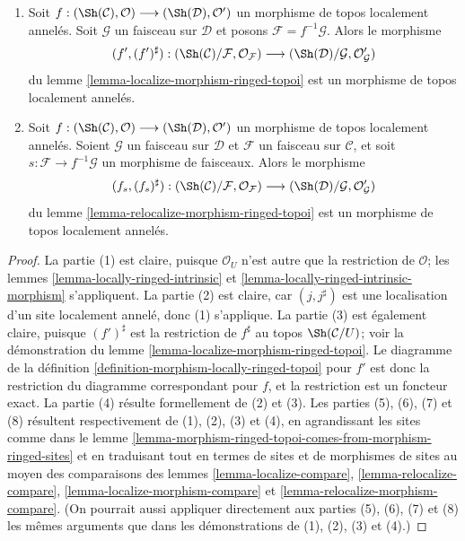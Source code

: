 \begin{lemma}
\begin{enumerate}
Soit $s : \mathcal{G} \to \mathcal{F}$ une application de faisceaux sur
$\mathcal{C}$. Alors le morphisme
$$
(j, j^\sharp) :
(\Sh(\mathcal{C})/\mathcal{G}, \mathcal{O}_\mathcal{G})
\longrightarrow
(\Sh(\mathcal{C})/\mathcal{F}, \mathcal{O}_\mathcal{F})
$$
du lemme \ref{lemma-relocalize-ringed-topos} est un morphisme de topos
localement annelés.
\item Soit
$f :
(\Sh(\mathcal{C}), \mathcal{O})
\longrightarrow
(\Sh(\mathcal{D}), \mathcal{O}')$
un morphisme de topos localement annelés. Soit $\mathcal{G}$ un faisceau sur
$\mathcal{D}$ et posons $\mathcal{F} = f^{-1}\mathcal{G}$. Alors le morphisme
$$
(f', (f')^\sharp) :
(\Sh(\mathcal{C})/\mathcal{F}, \mathcal{O}_\mathcal{F})
\longrightarrow
(\Sh(\mathcal{D})/\mathcal{G}, \mathcal{O}'_\mathcal{G})
$$
du lemme \ref{lemma-localize-morphism-ringed-topoi} est un morphisme de topos
localement annelés.
\item Soit
$f :
(\Sh(\mathcal{C}), \mathcal{O})
\longrightarrow
(\Sh(\mathcal{D}), \mathcal{O}')$
un morphisme de topos localement annelés. Soient $\mathcal{G}$ un faisceau sur
$\mathcal{D}$ et $\mathcal{F}$ un faisceau sur $\mathcal{C}$, et soit
$s : \mathcal{F} \to f^{-1}\mathcal{G}$ un morphisme de faisceaux. Alors le morphisme
$$
(f_s, (f_s)^\sharp) :
(\Sh(\mathcal{C})/\mathcal{F}, \mathcal{O}_\mathcal{F})
\longrightarrow
(\Sh(\mathcal{D})/\mathcal{G}, \mathcal{O}'_\mathcal{G})
$$
du lemme \ref{lemma-relocalize-morphism-ringed-topoi} est un morphisme de topos
localement annelés.
\end{enumerate}
\end{lemma}

\begin{proof}
La partie (1) est claire, puisque $\mathcal{O}_U$ n'est autre que la
restriction de $\mathcal{O}$; les lemmes
\ref{lemma-locally-ringed-intrinsic} et
\ref{lemma-locally-ringed-intrinsic-morphism} s'appliquent. La partie (2) est
claire, car $(j, j^\sharp)$ est une localisation d'un site localement annelé,
donc (1) s'applique. La partie (3) est également claire, puisque
$(f')^\sharp$ est la restriction de $f^\sharp$ au topos
$\Sh(\mathcal{C}/U)$; voir la démonstration du
lemme \ref{lemma-localize-morphism-ringed-topoi}. Le diagramme de la
définition \ref{definition-morphism-locally-ringed-topoi} pour $f'$ est donc
la restriction du diagramme correspondant pour $f$, et la restriction est un
foncteur exact. La partie (4) résulte formellement de (2) et (3). Les parties
(5), (6), (7) et (8) résultent respectivement de (1), (2), (3) et (4), en
agrandissant les sites comme dans le
lemme \ref{lemma-morphism-ringed-topoi-comes-from-morphism-ringed-sites} et en
traduisant tout en termes de sites et de morphismes de sites au moyen des comparaisons des lemmes
\ref{lemma-localize-compare},
\ref{lemma-relocalize-compare},
\ref{lemma-localize-morphism-compare} et
\ref{lemma-relocalize-morphism-compare}.
(On pourrait aussi appliquer directement aux parties (5), (6), (7) et (8) les
mêmes arguments que dans les démonstrations de (1), (2), (3) et (4).)
\end{proof}






